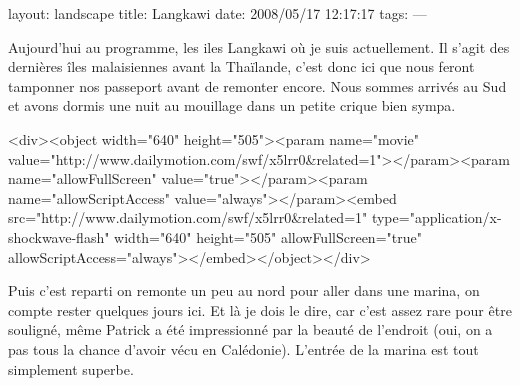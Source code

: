 layout: landscape
title: Langkawi
date: 2008/05/17 12:17:17
tags:
---

Aujourd'hui au programme, les iles Langkawi où je suis actuellement. Il s'agit des dernières îles malaisiennes avant la Thaïlande, c'est donc ici que nous feront tamponner nos passeport avant de remonter encore. Nous sommes arrivés au Sud et avons dormis une nuit au mouillage dans un petite crique bien sympa.

<div><object width="640" height="505"><param name="movie" value="http://www.dailymotion.com/swf/x5lrr0&related=1"></param><param name="allowFullScreen" value="true"></param><param name="allowScriptAccess" value="always"></param><embed src="http://www.dailymotion.com/swf/x5lrr0&related=1" type="application/x-shockwave-flash" width="640" height="505" allowFullScreen="true" allowScriptAccess="always"></embed></object></div>

Puis c'est reparti on remonte un peu au nord pour aller dans une marina, on compte rester quelques jours ici. Et là je dois le dire, car c'est assez rare pour être souligné, même Patrick a été impressionné par la beauté de l'endroit (oui, on a pas tous la chance d'avoir vécu en Calédonie). L'entrée de la marina est tout simplement superbe.

